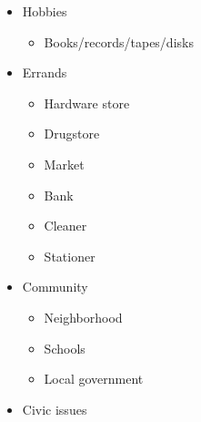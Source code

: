 \documentclass[10pt,landscape]{article}
\begin{document}
\begin{multicols}{3}
\begin{itemize}
\begin{itemize}
\end{itemize}

\item Hobbies \begin{itemize}
\item Books/records/tapes/disks 

\end{itemize}

\item Errands \begin{itemize}
\item Hardware store 
\item Drugstore 
\item Market 
\item Bank 
\item Cleaner 
\item Stationer 

\end{itemize}

\item Community \begin{itemize}
\item Neighborhood 
\item Schools 
\item Local government 

\end{itemize}

\item Civic issues 

\end{itemize}

\end{multicols}
\end{document}
